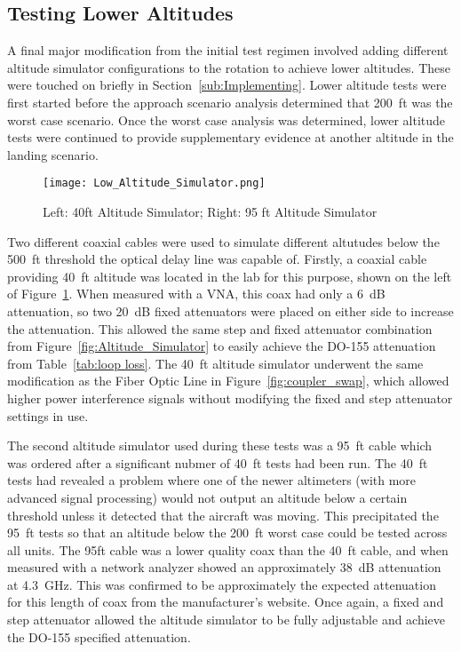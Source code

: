 \subsection{Testing Lower Altitudes}
A final major modification from the initial test regimen involved adding different altitude simulator configurations to the rotation to achieve lower altitudes. These were touched on briefly in Section~\ref{sub:Implementing}. Lower altitude tests were first started before the approach scenario analysis determined that 200~ft was the worst case scenario. Once the worst case analysis was determined, lower altitude tests were continued to provide supplementary evidence at another altitude in the landing scenario. 
\begin{figure}[ht]
\centering
\texttt{[image: Low\_Altitude\_Simulator.png]}
\caption{Left: 40ft Altitude Simulator; Right: 95 ft Altitude Simulator}

\label{fig:Low_Altitudes}

\end{figure}

Two different coaxial cables were used to simulate different altutudes below the 500~ft threshold the optical delay line was capable of. Firstly, a coaxial cable providing 40~ft altitude was located in the lab for this purpose, shown on the left of Figure~\ref{fig:Low_Altitudes}. When measured with a VNA, this coax had only a 6~dB attenuation, so two 20~dB fixed attenuators were placed on either side to increase the attenuation. This allowed the same step and fixed attenuator combination from Figure~\ref{fig:Altitude_Simulator} to easily achieve the DO-155 attenuation from Table~\ref{tab:loop loss}. The 40~ft altitude simulator underwent the same modification as the Fiber Optic Line in Figure~\ref{fig:coupler_swap}, which allowed higher power interference signals without modifying the fixed and step attenuator settings in use. 

The second altitude simulator used during these tests was a 95~ft cable which was ordered after a significant nubmer of 40~ft tests had been run. The 40~ft tests had revealed a problem where one of the newer altimeters (with more advanced signal processing) would not output an altitude below a certain threshold unless it detected that the aircraft was moving. This precipitated the 95~ft tests so that an altitude below the 200~ft worst case could be tested across all units. The 95ft cable was a lower quality coax than the 40~ft cable, and when measured with a network analyzer showed an approximately 38~dB attenuation at 4.3~GHz. This was confirmed to be approximately the expected attenuation for this length of coax from the manufacturer's website. Once again, a fixed and step attenuator allowed the altitude simulator to be fully adjustable and achieve the DO-155 specified attenuation. 

